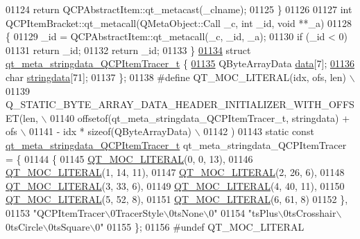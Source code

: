 \begin{DoxyCode}
01124     \textcolor{keywordflow}{return} QCPAbstractItem::qt\_metacast(\_clname);
01125 \}
01126 
01127 \textcolor{keywordtype}{int} QCPItemBracket::qt\_metacall(QMetaObject::Call \_c, \textcolor{keywordtype}{int} \_id, \textcolor{keywordtype}{void} **\_a)
01128 \{
01129     \_id = QCPAbstractItem::qt\_metacall(\_c, \_id, \_a);
01130     \textcolor{keywordflow}{if} (\_id < 0)
01131         \textcolor{keywordflow}{return} \_id;
01132     \textcolor{keywordflow}{return} \_id;
01133 \}
\hypertarget{a00016_source_l01134}{}\hyperlink{a00016}{01134} \textcolor{keyword}{struct }\hyperlink{a00016_d3/d00/a00113}{qt\_meta\_stringdata\_QCPItemTracer\_t} \{
\hypertarget{a00016_source_l01135}{}\hyperlink{a00016_a87c91fdce2044ef334c2cfd91e38ac00}{01135}     QByteArrayData \hyperlink{a00016_a87c91fdce2044ef334c2cfd91e38ac00}{data}[7];
\hypertarget{a00016_source_l01136}{}\hyperlink{a00016_a28c4c1cde887cbe6b6af18ce9d6ed867}{01136}     \textcolor{keywordtype}{char} \hyperlink{a00016_a28c4c1cde887cbe6b6af18ce9d6ed867}{stringdata}[71];
01137 \};
01138 \textcolor{preprocessor}{#define QT\_MOC\_LITERAL(idx, ofs, len) \(\backslash\)}
01139 \textcolor{preprocessor}{    Q\_STATIC\_BYTE\_ARRAY\_DATA\_HEADER\_INITIALIZER\_WITH\_OFFSET(len, \(\backslash\)}
01140 \textcolor{preprocessor}{    offsetof(qt\_meta\_stringdata\_QCPItemTracer\_t, stringdata) + ofs \(\backslash\)}
01141 \textcolor{preprocessor}{        - idx * sizeof(QByteArrayData) \(\backslash\)}
01142 \textcolor{preprocessor}{    )}
01143 \textcolor{keyword}{static} \textcolor{keyword}{const} \hyperlink{a00016_d3/d00/a00113}{qt\_meta\_stringdata\_QCPItemTracer\_t} 
      qt\_meta\_stringdata\_QCPItemTracer = \{
01144     \{
01145 \hyperlink{a00016_a75bb9482d242cde0a06c9dbdc6b83abe}{QT\_MOC\_LITERAL}(0, 0, 13),
01146 \hyperlink{a00016_a75bb9482d242cde0a06c9dbdc6b83abe}{QT\_MOC\_LITERAL}(1, 14, 11),
01147 \hyperlink{a00016_a75bb9482d242cde0a06c9dbdc6b83abe}{QT\_MOC\_LITERAL}(2, 26, 6),
01148 \hyperlink{a00016_a75bb9482d242cde0a06c9dbdc6b83abe}{QT\_MOC\_LITERAL}(3, 33, 6),
01149 \hyperlink{a00016_a75bb9482d242cde0a06c9dbdc6b83abe}{QT\_MOC\_LITERAL}(4, 40, 11),
01150 \hyperlink{a00016_a75bb9482d242cde0a06c9dbdc6b83abe}{QT\_MOC\_LITERAL}(5, 52, 8),
01151 \hyperlink{a00016_a75bb9482d242cde0a06c9dbdc6b83abe}{QT\_MOC\_LITERAL}(6, 61, 8)
01152     \},
01153     \textcolor{stringliteral}{"QCPItemTracer\(\backslash\)0TracerStyle\(\backslash\)0tsNone\(\backslash\)0"}
01154     \textcolor{stringliteral}{"tsPlus\(\backslash\)0tsCrosshair\(\backslash\)0tsCircle\(\backslash\)0tsSquare\(\backslash\)0"}
01155 \};
01156 \textcolor{preprocessor}{#undef QT\_MOC\_LITERAL}

\end{DoxyCode}
